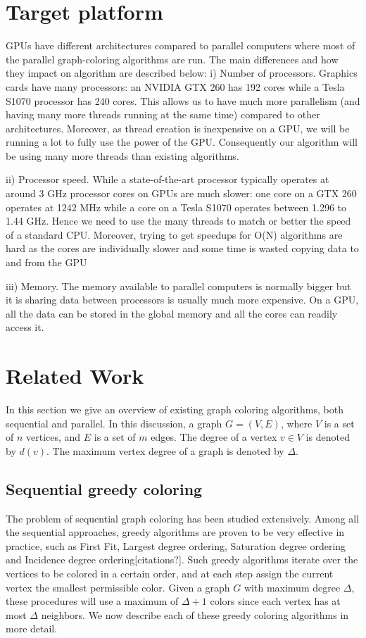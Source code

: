 \documentclass[preprint]{sigplanconf}
\begin{document}
\section{Target platform}
GPUs have different architectures compared to parallel computers where most of the parallel graph-coloring algorithms are run. The main differences and how they impact on algorithm are described below:
i) Number of processors. Graphics cards have many processors: an NVIDIA GTX 260 has 192 cores while a Tesla S1070 processor has 240 cores. This allows us to have much more parallelism (and having many more threads running at the same time) compared to other architectures. Moreover, as thread creation is inexpensive on a GPU, we will be running a lot to fully use the power of the GPU. Consequently our algorithm will be using many more threads than existing algorithms.

ii) Processor speed. While a state-of-the-art processor typically operates at around 3 GHz processor cores on GPUs are much slower: one core on a GTX 260 operates at 1242 MHz while a core on a Tesla S1070 operates between 1.296 to 1.44  GHz. Hence we need to use the many threads to match or better the speed of a standard CPU. Moreover, trying to get speedups for  O(N) algorithms are hard as the cores are individually slower and some time is wasted copying data to and from the GPU

iii) Memory. The memory available to parallel computers is normally bigger but it is sharing data between processors is usually much more expensive. On a GPU, all the data can be stored in the global memory and all the cores can readily access it.


\section{ Related Work}
In this section we give an overview of existing graph coloring algorithms, both sequential and parallel.  In this discussion, a graph $G=(V,E)$, where $V$ is a set of $n$ vertices, and $E$ is a set of $m$ edges. The degree of a vertex $v \in V$ is denoted by $d(v)$. The maximum vertex degree of a graph is denoted by $\Delta$.

\subsection{Sequential greedy coloring}

The problem of sequential graph coloring has been studied extensively. Among all the sequential approaches, greedy algorithms are proven to be very effective in practice, such as First Fit, Largest degree ordering, Saturation degree ordering and Incidence degree ordering[citations?]. Such greedy algorithms iterate over the vertices to be colored in a certain order, and at each step assign the current vertex the smallest permissible color. Given a graph $G$ with maximum degree $\Delta$, these procedures will use a maximum of $\Delta+1$ colors since each vertex has at most $\Delta$ neighbors. We now describe each of these greedy coloring algorithms in more detail.
\end{document}
